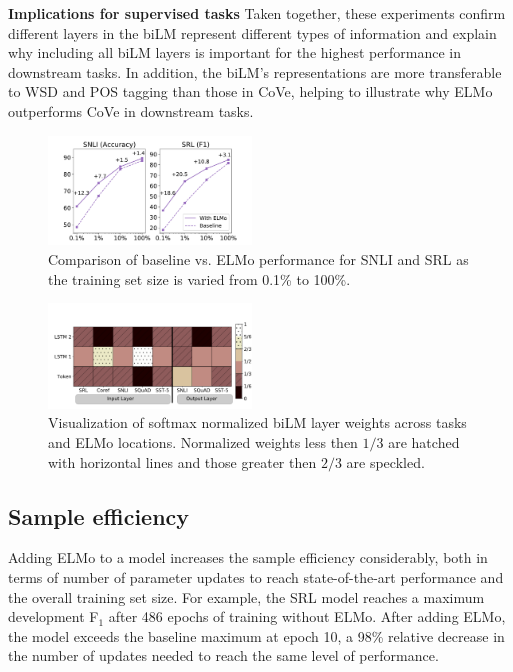 \documentclass[11pt,a4paper]{article}
\newcommand{\ELMO}{ELMo}
\newcommand{\tinysection}[1]{\textbf{#1}}
\begin{document}
\tinysection{Implications for supervised tasks}
Taken together, these experiments confirm different layers in the biLM represent different types of information and explain why including all biLM layers is important for the highest performance in downstream tasks.
In addition, the biLM's representations are more transferable to WSD and POS tagging than those in CoVe, 
helping to illustrate why \ELMO{} outperforms CoVe in downstream tasks. 


\begin{figure}
\centering
  \label{fig:small_data}
  \includegraphics[width=0.48\textwidth]{elmo_training_set_size}
  \caption{Comparison of baseline vs. \ELMO{} performance for SNLI and SRL as the training set size is varied from 0.1\% to 100\%.
}
\end{figure}

\begin{figure}
  \label{fig:weight_visualization}
  \includegraphics[width=0.48\textwidth]{weight_visualization}
  \caption{Visualization of softmax normalized biLM layer weights across tasks and \ELMO{} locations.  Normalized weights less then $1/3$ are hatched with horizontal lines and those greater then $2/3$ are speckled.
  }
\end{figure}




\subsection{Sample efficiency}
\label{sec:sample_efficiency}
Adding \ELMO{} to a model increases the sample efficiency considerably, both in terms of number of parameter updates to reach state-of-the-art performance and the overall training set size. For example, the SRL model reaches a maximum development F$_1$ after 486 epochs of training without \ELMO.  After adding \ELMO, the model exceeds the baseline maximum at epoch 10, a 98\% relative decrease in the number of updates needed to reach the same level of performance.
\end{document}

